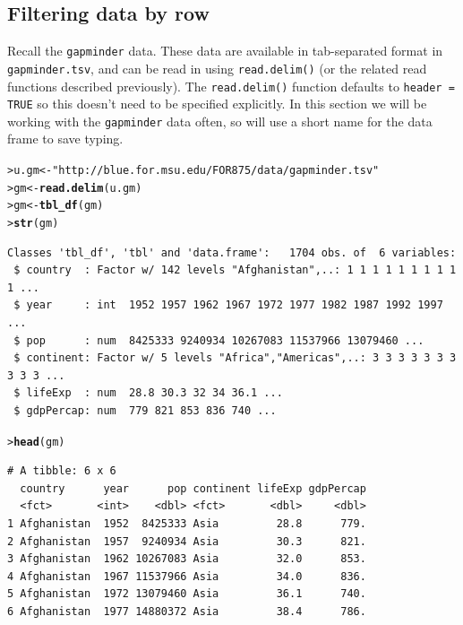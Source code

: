 \documentclass[12pt,oneside]{book}\usepackage[]{graphicx}\usepackage[]{color}
\makeatletter
\newcommand{\hlstr}[1]{\textcolor[rgb]{0.192,0.494,0.8}{#1}}%
\newcommand{\hlstd}[1]{\textcolor[rgb]{0.345,0.345,0.345}{#1}}%
\newcommand{\hlkwb}[1]{\textcolor[rgb]{0.69,0.353,0.396}{#1}}%
\newcommand{\hlkwd}[1]{\textcolor[rgb]{0.737,0.353,0.396}{\textbf{#1}}}%
\newenvironment{kframe}{%
 \def\at@end@of@kframe{}%
 \ifinner\ifhmode%
  \def\at@end@of@kframe{\end{minipage}}%
  \begin{minipage}{\columnwidth}%
 \fi\fi%
 \def\FrameCommand##1{\hskip\@totalleftmargin \hskip-\fboxsep
 \colorbox{shadecolor}{##1}\hskip-\fboxsep
     \hskip-\linewidth \hskip-\@totalleftmargin \hskip\columnwidth}%
 \MakeFramed {\advance\hsize-\width
   \@totalleftmargin\z@ \linewidth\hsize
   \@setminipage}}%
 {\par\unskip\endMakeFramed%
 \at@end@of@kframe}
\newenvironment{knitrout}{}{} %
\makeatother
\begin{document}
\subsection{Filtering data by row}
Recall the \verb+gapminder+ data. These data are available in tab-separated format in \verb+gapminder.tsv+, and can be read in using \verb+read.delim()+ (or the related read functions described previously). The \verb+read.delim()+ function defaults to \verb+header = TRUE+ so this doesn't need to be specified explicitly. In this section we will be working with the \verb+gapminder+ data often, so will use a short name for the data frame to save typing.
\begin{knitrout}
\color{fgcolor}\begin{kframe}
\begin{alltt}
\hlstd{> }\hlstd{u.gm} \hlkwb{<-} \hlstr{"http://blue.for.msu.edu/FOR875/data/gapminder.tsv"}
\hlstd{> }\hlstd{gm} \hlkwb{<-} \hlkwd{read.delim}\hlstd{(u.gm)}
\hlstd{> }\hlstd{gm} \hlkwb{<-} \hlkwd{tbl_df}\hlstd{(gm)}
\hlstd{> }\hlkwd{str}\hlstd{(gm)}
\end{alltt}
\begin{verbatim}
Classes 'tbl_df', 'tbl' and 'data.frame':	1704 obs. of  6 variables:
 $ country  : Factor w/ 142 levels "Afghanistan",..: 1 1 1 1 1 1 1 1 1 1 ...
 $ year     : int  1952 1957 1962 1967 1972 1977 1982 1987 1992 1997 ...
 $ pop      : num  8425333 9240934 10267083 11537966 13079460 ...
 $ continent: Factor w/ 5 levels "Africa","Americas",..: 3 3 3 3 3 3 3 3 3 3 ...
 $ lifeExp  : num  28.8 30.3 32 34 36.1 ...
 $ gdpPercap: num  779 821 853 836 740 ...
\end{verbatim}
\begin{alltt}
\hlstd{> }\hlkwd{head}\hlstd{(gm)}
\end{alltt}
\begin{verbatim}
# A tibble: 6 x 6
  country      year      pop continent lifeExp gdpPercap
  <fct>       <int>    <dbl> <fct>       <dbl>     <dbl>
1 Afghanistan  1952  8425333 Asia         28.8      779.
2 Afghanistan  1957  9240934 Asia         30.3      821.
3 Afghanistan  1962 10267083 Asia         32.0      853.
4 Afghanistan  1967 11537966 Asia         34.0      836.
5 Afghanistan  1972 13079460 Asia         36.1      740.
6 Afghanistan  1977 14880372 Asia         38.4      786.
\end{verbatim}
\end{kframe}
\end{knitrout}
\end{document}

